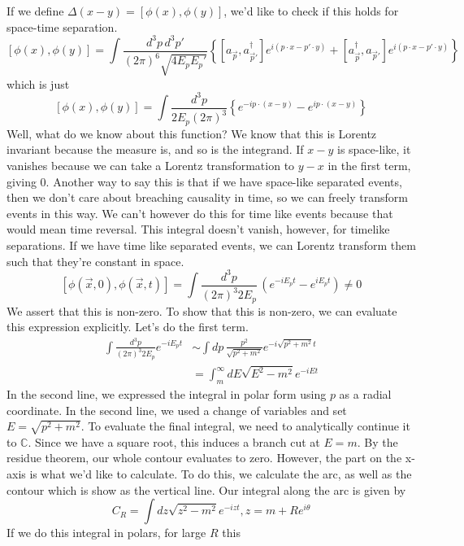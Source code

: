 \documentclass[11pt, oneside]{article}   	%
\theoremstyle{newline}
\theoremstyle{newline}
\theoremstyle{newline}
\theoremstyle{newline}
\theoremstyle{newline}
\begin{document}
If we define $ \Delta( x -y )  = [ \phi ( x), \phi ( y ) ] $, we'd like to check if this holds for space-time separation.  
\[ [ \phi ( x), \phi ( y ) ]  = 
\int \frac{d^{ 3 } p \, d^ 3 p' }{ ( 2 \pi )^6 \sqrt{ 4 E_p E_p' } } \left\{ [a_{\vec{p}}, a_{\vec{p}'}^\dagger ] e^{ i ( p \cdot  x  - p' \cdot  y) } + [ a_{\vec{p}}^\dagger , a_{\vec{p}'} ] e^{ i ( p \cdot  x - p ' \cdot  y) }   \right\} 
\] which is just 
\[ [ \phi ( x) , \phi ( y ) ] 
= \int \frac{ d^3 p }{ 2 E_p ( 2 \pi )^3 } \left\{ e^{  - i p \cdot  ( x - y ) } - e^{ i p \cdot  ( x - y ) } \right\} 
\] Well, what do we know about this function? 
We know that this is Lorentz invariant because the measure is, and so is the 
integrand. 
If  $ x - y $ is space-like, it vanishes because we can take
a Lorentz transformation to $ y - x$ in the first term, 
giving 0. Another way to say this is that if we have space-like separated events, 
then we don't care about breaching causality in time, so we can freely 
transform events in this way. We can't however do this for 
time like events because that would mean time reversal. 
This integral doesn't vanish, however, 
for timelike separations. If we have time like separated events, we 
can Lorentz transform them such that they're constant in space. 
\[
[ \phi ( \vec{x}, 0 ) , \phi ( \vec{x}, t ) ] = \int \frac{d^3 p }{ ( 2\pi ) ^3 2 E_p }\, ( e^{  - i E_p t }  - e^{ i E_p t } ) \neq 0 
\]
We assert that this is non-zero.
To show that this is non-zero, we can evaluate this expression explicitly. Let's do the 
first term. 
\begin{align*}
\int \frac{d^ 3 p }{( 2 \pi )^  3 2E_p }e^{  - i E_p t } & \sim \int dp \, \frac{p^ 2 }{ \sqrt{ p ^2 + m^2 }  }e^{  -i \sqrt{ p^2 + m^ 2 }  t} \\
& = \int_m^\infty dE \sqrt{ E^2  - m^ 2 } e^{  - i E t }
\end{align*}
In the second line, we expressed the integral  in polar form using $ p $ as a radial coordinate. 
In the second line, we used a change of variables and 
set $ E = \sqrt{ p^ 2 + m^2 } $. To evaluate the final integral, 
we need to analytically continue it to $ \mathbb{ C} $. 
Since we have a square root, this induces a branch cut at 
$ E = m $. By the residue theorem, our whole contour evaluates to zero. 
However, the part on the x-axis is what we'd like to calculate. 
To do this, we calculate the arc, as well as the contour which is show as the vertical line. 
Our integral along the arc is given by 
\[
C_R  = 	\int dz \sqrt{ z^2  - m^2 }  e^{ - i z t }, z = m + Re^{ i \theta }  
\] If we do this integral in polars, for large $ R $ this 
\end{document}
